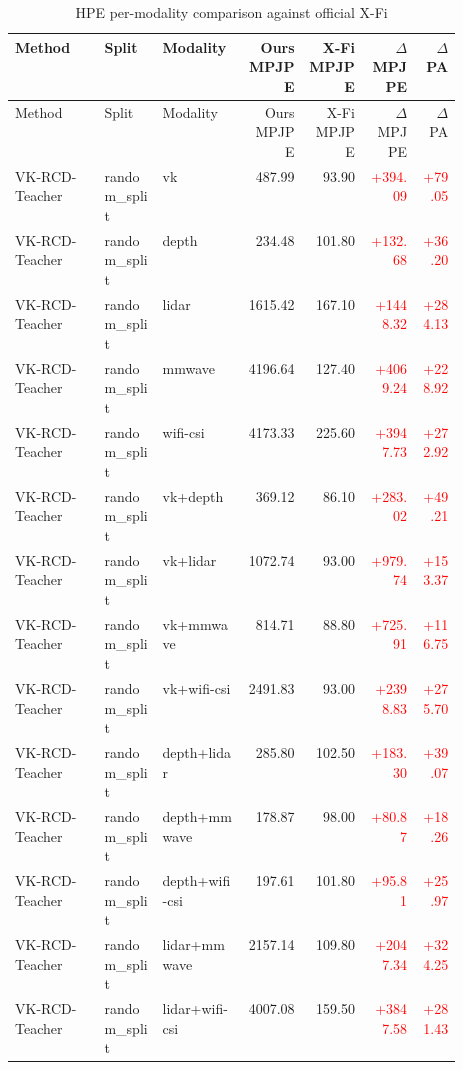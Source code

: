 \begin{longtable}{p{0.20\linewidth}p{0.13\linewidth}p{0.19\linewidth}rrrr}
\caption{HPE per-modality comparison against official X-Fi}\\
\toprule
Method & Split & Modality & Ours MPJPE & X-Fi MPJPE & $\Delta$ MPJPE & $\Delta$ PA\\\midrule
\endfirsthead
\toprule
Method & Split & Modality & Ours MPJPE & X-Fi MPJPE & $\Delta$ MPJPE & $\Delta$ PA\\\midrule
\endhead
VK-RCD-Teacher & random\_split & vk & 487.99 & 93.90 & \textcolor{red}{+394.09} & \textcolor{red}{+79.05}\\
VK-RCD-Teacher & random\_split & depth & 234.48 & 101.80 & \textcolor{red}{+132.68} & \textcolor{red}{+36.20}\\
VK-RCD-Teacher & random\_split & lidar & 1615.42 & 167.10 & \textcolor{red}{+1448.32} & \textcolor{red}{+284.13}\\
VK-RCD-Teacher & random\_split & mmwave & 4196.64 & 127.40 & \textcolor{red}{+4069.24} & \textcolor{red}{+228.92}\\
VK-RCD-Teacher & random\_split & wifi-csi & 4173.33 & 225.60 & \textcolor{red}{+3947.73} & \textcolor{red}{+272.92}\\
VK-RCD-Teacher & random\_split & vk+depth & 369.12 & 86.10 & \textcolor{red}{+283.02} & \textcolor{red}{+49.21}\\
VK-RCD-Teacher & random\_split & vk+lidar & 1072.74 & 93.00 & \textcolor{red}{+979.74} & \textcolor{red}{+153.37}\\
VK-RCD-Teacher & random\_split & vk+mmwave & 814.71 & 88.80 & \textcolor{red}{+725.91} & \textcolor{red}{+116.75}\\
VK-RCD-Teacher & random\_split & vk+wifi-csi & 2491.83 & 93.00 & \textcolor{red}{+2398.83} & \textcolor{red}{+275.70}\\
VK-RCD-Teacher & random\_split & depth+lidar & 285.80 & 102.50 & \textcolor{red}{+183.30} & \textcolor{red}{+39.07}\\
VK-RCD-Teacher & random\_split & depth+mmwave & 178.87 & 98.00 & \textcolor{red}{+80.87} & \textcolor{red}{+18.26}\\
VK-RCD-Teacher & random\_split & depth+wifi-csi & 197.61 & 101.80 & \textcolor{red}{+95.81} & \textcolor{red}{+25.97}\\
VK-RCD-Teacher & random\_split & lidar+mmwave & 2157.14 & 109.80 & \textcolor{red}{+2047.34} & \textcolor{red}{+324.25}\\
VK-RCD-Teacher & random\_split & lidar+wifi-csi & 4007.08 & 159.50 & \textcolor{red}{+3847.58} & \textcolor{red}{+281.43}\\

\end{longtable}
